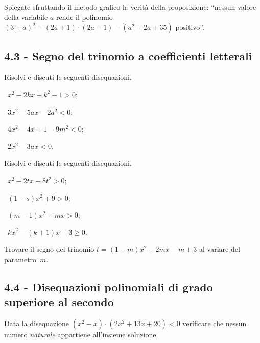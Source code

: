 \begin{esercizio}
 \label{ese:4.23}
Spiegate sfruttando il metodo grafico la verità della proposizione: ``nessun valore della variabile $a$ rende il polinomio $(3+a)^2-(2a+1)\cdot (2a-1)-(a^2+2a+35)$ positivo''.
\end{esercizio}

\subsection*{4.3 - Segno del trinomio a coefficienti letterali}

\begin{esercizio}[\Ast]
 \label{ese:4.24}
Risolvi e discuti le seguenti disequazioni.
\begin{multicols}{2}
 \begin{enumeratea}
 \item~$x^2-2{kx}+k^2-1>0$;
 \item~$3x^2-5{ax}-2a^2<0$;
 \item~$4x^2-4x+1-9m^2<0$;
 \item~$2x^2-3{ax}<0$.
 \end{enumeratea}
 \end{multicols}
\end{esercizio}

\begin{esercizio}[\Ast]
 \label{ese:4.25}
Risolvi e discuti le seguenti disequazioni.
\begin{multicols}{2}
 \begin{enumeratea}
 \item~$x^2-2{tx}-8t^2>0$;
 \item~$(1-s)x^2+9>0$;
 \item~$(m-1)x^2-{mx}>0$;
 \item~${kx}^2-(k+1)x-3\ge 0$.
 \end{enumeratea}
 \end{multicols}
\end{esercizio}

\begin{esercizio}
 \label{ese:4.26}
Trovare il segno del trinomio $t=(1-m)x^2-2{mx}-m+3$ al variare del parametro~$m$.
\end{esercizio}

\subsection*{4.4 - Disequazioni polinomiali di grado superiore al secondo}

\begin{esercizio}
 \label{ese:4.27}
Data la disequazione $\left(x^2-x\right)\cdot \left(2x^2+13x+20\right)<0$ verificare che nessun numero \emph{naturale} appartiene all'insieme soluzione.
\end{esercizio}

